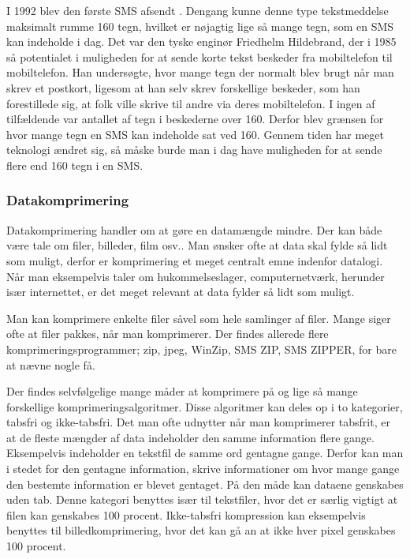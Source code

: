 I 1992 blev den første SMS afsendt \cite{museum}. Dengang kunne denne type tekstmeddelse maksimalt rumme 160 tegn, hvilket er nøjagtig lige så mange tegn, som en SMS kan indeholde i dag. Det var den tyske enginør Friedhelm Hildebrand, der i 1985 så potentialet i muligheden for at sende korte tekst beskeder fra mobiltelefon til mobiltelefon. Han undersøgte, hvor mange tegn der normalt blev brugt når man skrev et postkort, ligesom at han selv skrev forskellige beskeder, som han forestillede sig, at folk ville skrive til andre via deres mobiltelefon. I ingen af tilfældende var antallet af tegn i beskederne over 160. Derfor blev grænsen for hvor mange tegn en SMS kan indeholde sat ved 160.
Gennem tiden har meget teknologi ændret sig, så måske burde man i dag have muligheden for at sende flere end 160 tegn i en SMS. \cite{hillebrand}

\subsubsection {Datakomprimering}

Datakomprimering handler om at gøre en datamængde mindre. Der kan både være tale om filer, billeder, film osv.. Man ønsker ofte at data skal fylde så lidt som muligt, derfor er komprimering et meget centralt emne indenfor datalogi. Når man eksempelvis taler om hukommelseslager, computernetværk, herunder især internettet, er det meget relevant at data fylder så lidt som muligt.
 
Man kan komprimere enkelte filer såvel som hele samlinger af filer. Mange siger ofte at filer pakkes, når man komprimerer. Der findes allerede flere komprimeringsprogrammer; zip, jpeg, WinZip, SMS ZIP, SMS ZIPPER, for bare at nævne nogle få.

Der findes selvfølgelige mange måder at komprimere på og lige så mange forskellige komprimeringsalgoritmer. Disse algoritmer kan deles op i to kategorier, tabsfri og ikke-tabsfri.  
Det man ofte udnytter når man komprimerer tabsfrit, er at de fleste mængder af data indeholder den samme information flere gange. Eksempelvis indeholder en tekstfil de samme ord gentagne gange. Derfor kan man i stedet for den gentagne information, skrive informationer om hvor mange gange den bestemte information er blevet gentaget. På den måde kan dataene genskabes uden tab. Denne kategori benyttes især til tekstfiler, hvor det er særlig vigtigt at filen kan genskabes 100 procent. Ikke-tabsfri kompression kan eksempelvis benyttes til billedkomprimering, hvor det kan gå an at ikke hver pixel genskabes 100 procent.
